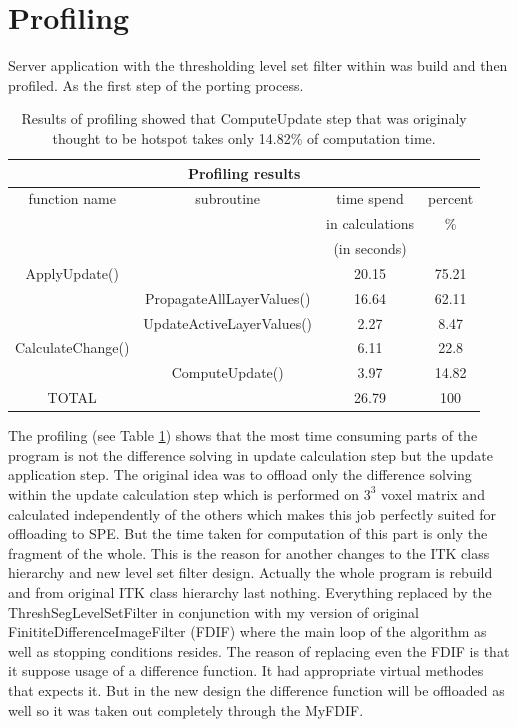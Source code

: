 \section{Profiling}

Server application with the thresholding level set filter within was build and then profiled. As the first step of the porting process.

\begin{table}
\centering
\begin{tabular}{|c|c|c|c|}
\hline
\multicolumn{4}{|c|}{Profiling results}\\
\hline
function name&subroutine&time spend&percent\\&&in calculations&\%\\&&(in seconds)&\\
\hline
\hline
ApplyUpdate()	&				&	20.15&	75.21\\
\hline
		&PropagateAllLayerValues()	&	16.64&	62.11\\
\hline
		&UpdateActiveLayerValues()	&	2.27&	8.47\\
\hline
CalculateChange()&				&	6.11&	22.8\\
\hline
		&ComputeUpdate()		&	3.97&	14.82\\
\hline
TOTAL		&				&	26.79&	100\\
\hline
\end{tabular}
\par
\caption[Profiling results]
{
  Results of profiling showed that ComputeUpdate step that was originaly thought to be hotspot takes only 14.82\% of computation time.
}
\label{tab:profilingresults}
\end{table}

The profiling (see Table \ref{tab:profilingresults}) shows that the most time consuming parts of the program is not the difference solving in update calculation step but the update application step.
The original idea was to offload only the difference solving within the update calculation step which is performed on $3^3$ voxel matrix and calculated independently of the others which makes this job perfectly suited for offloading to SPE.
But the time taken for computation of this part is only the fragment of the whole.
This is the reason for another changes to the ITK class hierarchy and new level set filter design.
Actually the whole program is rebuild and from original ITK class hierarchy last nothing.
Everything replaced by the ThreshSegLevelSetFilter in conjunction with my version of original FinititeDifferenceImageFilter (FDIF) where the main loop of the algorithm as well as stopping conditions resides.
The reason of replacing even the FDIF is that it suppose usage of a difference function.
It had appropriate virtual methodes that expects it.
But in the new design the difference function will be offloaded as well so it was taken out completely through the MyFDIF.

